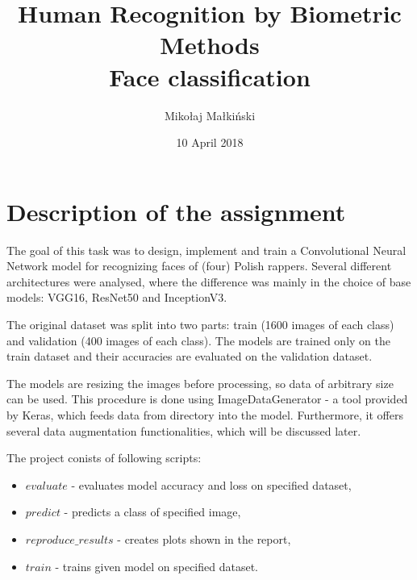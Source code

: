\documentclass[a4paper,12pt]{article}
\title{
  \textbf{Human Recognition by Biometric Methods}\\
  \bigskip
  \textbf{Face classification}\\  
  \bigskip
}
\author{Mikołaj Małkiński}
\date{10 April 2018}
\begin{document}
\maketitle

\section{Description of the assignment}

The goal of this task was to design, implement and train a Convolutional Neural Network model for recognizing faces of (four) Polish rappers. Several different architectures were analysed, where the difference was mainly in the choice of base models: VGG16, ResNet50 and InceptionV3.
\par
The original dataset was split into two parts: train (1600 images of each class) and validation (400 images of each class). The models are trained only on the train dataset and their accuracies are evaluated on the validation dataset.
\par
The models are resizing the images before processing, so data of arbitrary size can be used. This procedure is done using ImageDataGenerator - a tool provided by Keras, which feeds data from directory into the model. Furthermore, it offers several data augmentation functionalities, which will be discussed later.
\par
The project conists of following scripts:
\begin{itemize}
\item $evaluate$ - evaluates model accuracy and loss on specified dataset,
\item $predict$ - predicts a class of specified image,
\item $reproduce\_results$ - creates plots shown in the report,
\item $train$ - trains given model on specified dataset.
\end{itemize}
\end{document}
